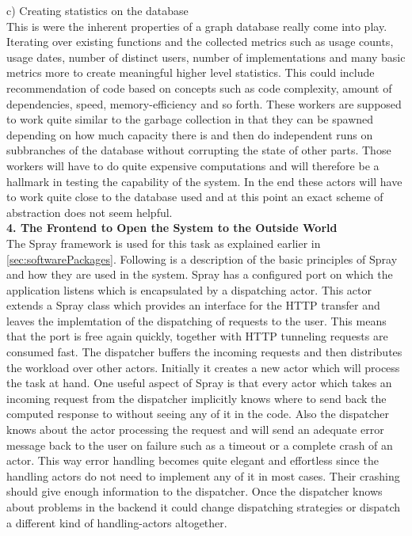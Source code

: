 \documentclass[twoside, 11pt]{scrartcl}
\begin{document}
c) Creating statistics on the database\\
This is were the inherent properties of a graph database really come into play. Iterating over existing functions and the collected metrics such as usage counts, usage dates, number of distinct users, number of implementations and many basic metrics more to create meaningful higher level statistics. This could include recommendation of code based on concepts such as code complexity, amount of dependencies, speed, memory-efficiency and so forth. These workers are supposed to work quite similar to the garbage collection in that they can be spawned depending on how much capacity there is and then do independent runs on subbranches of the database without corrupting the state of other parts. Those workers will have to do quite expensive computations and will therefore be a hallmark in testing the capability of the system. In the end these actors will have to work quite close to the database used and at this point an exact scheme of abstraction does not seem helpful.\\

\textbf{4. The Frontend to Open the System to the Outside World}\\
The Spray framework is used for this task as explained earlier in \ref{sec:softwarePackages}. 
Following is a description of the basic principles of Spray and how they are used in the system.
Spray has a configured port on which the application listens which is encapsulated by a dispatching actor. This actor extends a Spray class which provides an interface for the  HTTP transfer and leaves the implemtation of the dispatching of requests to the user. This means that the port is free again quickly, together with HTTP tunneling requests are consumed fast. The dispatcher buffers the incoming requests and then distributes the workload over other actors. Initially it creates a new actor which will process the task at hand. One useful  aspect of Spray is that every actor which takes an incoming request from the dispatcher implicitly knows where to send back the computed response to without seeing any of it in the code. Also the dispatcher knows about the actor processing the request and will send an adequate error message back to the user on failure such as a timeout or a complete crash of an actor. This way error handling becomes quite elegant and effortless since the handling actors do not need to implement any of it in most cases. Their crashing should give enough information to the dispatcher. Once the dispatcher knows about problems in the backend it could change dispatching strategies or dispatch a different kind of handling-actors altogether.
\end{document}

